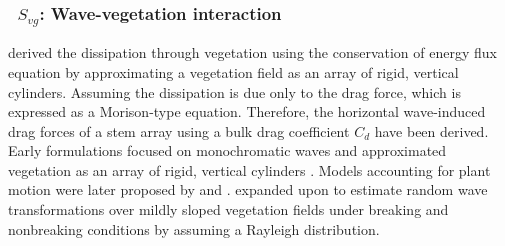\vsssub
\subsubsection{~$S_{vg}$: Wave-vegetation interaction} \label{sec:VG1}
\vsssub


\cite{dalrymple1984wave} derived the dissipation through vegetation using the conservation of energy flux equation by approximating a vegetation field as an array of rigid, vertical cylinders. Assuming the dissipation is due only to the drag force, which is expressed as a Morison-type equation. Therefore, the horizontal wave-induced drag forces of a stem array using a bulk drag coefficient $C_d$ have been derived. Early formulations focused on monochromatic waves and approximated vegetation as an array of rigid, vertical cylinders \citep{dalrymple1984wave,kobayashi1993wave}. Models accounting for plant motion were later proposed by \cite{asano1993interaction} and \cite{mendez1999hydrodynamics}.\cite{mendez2004empirical} expanded upon \cite{dalrymple1984wave} to estimate random wave transformations over mildly sloped vegetation fields under breaking and nonbreaking conditions by assuming a Rayleigh distribution. 


